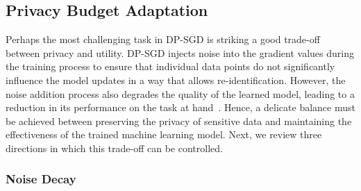 \subsection{Privacy Budget Adaptation}
\label{secPri}
Perhaps the most challenging task in DP-SGD is striking a good trade-off between privacy and utility. DP-SGD injects noise into the gradient values during the training process to ensure that individual data points do not significantly influence the model updates in a way that allows re-identification. However, the noise addition process also degrades the quality of the learned model, leading to a reduction in its performance on the task at hand~\cite{RefWorks:RefID:40-abadi2016deep}. Hence, a delicate balance must be achieved between preserving the privacy of sensitive data and maintaining the effectiveness of the trained machine learning model. Next, we review three directions in which this trade-off can be controlled.



\subsubsection{Noise Decay}
\label{decay}


